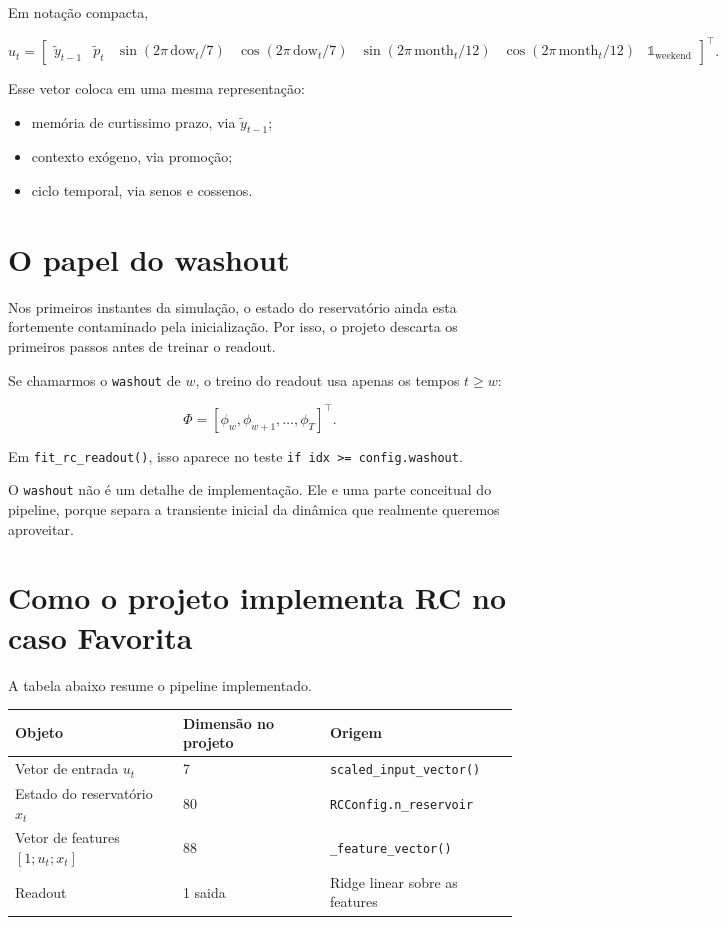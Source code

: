 \documentclass[12pt]{article}
\providecommand{\tightlist}{%
  \setlength{\itemsep}{0pt}\setlength{\parskip}{0pt}}
\begin{document}
Em notação compacta,

\[
u_t =
\begin{bmatrix}
\widetilde{y}_{t-1} &
\widetilde{p}_t &
\sin(2\pi \, \mathrm{dow}_t / 7) &
\cos(2\pi \, \mathrm{dow}_t / 7) &
\sin(2\pi \, \mathrm{month}_t / 12) &
\cos(2\pi \, \mathrm{month}_t / 12) &
\mathbb{1}_{\mathrm{weekend}}
\end{bmatrix}^\top.
\]

Esse vetor coloca em uma mesma representação:

\begin{itemize}
\tightlist
\item
  memória de curtissimo prazo, via \(\widetilde{y}_{t-1}\);
\item
  contexto exógeno, via promoção;
\item
  ciclo temporal, via senos e cossenos.
\end{itemize}

\section{O papel do washout}\label{6-o-papel-do-washout}

Nos primeiros instantes da simulação, o estado do reservatório ainda esta fortemente contaminado pela inicialização. Por isso, o projeto descarta os primeiros passos antes de treinar o readout.

Se chamarmos o \texttt{washout} de \(w\), o treino do readout usa apenas os tempos \(t \ge w\):

\[
\Phi = [\phi_w, \phi_{w+1}, \dots, \phi_T]^\top.
\]

Em \texttt{fit\_rc\_readout()}, isso aparece no teste \texttt{if\ idx\ \textgreater{}=\ config.washout}.

O \texttt{washout} não é um detalhe de implementação. Ele e uma parte conceitual do pipeline, porque separa a transiente inicial da dinâmica que realmente queremos aproveitar.

\section{Como o projeto implementa RC no caso Favorita}\label{7-como-o-projeto-implementa-rc-no-caso-favorita}

A tabela abaixo resume o pipeline implementado.

\begin{longtable}[]{@{}lll@{}}
\toprule\noalign{}
Objeto & Dimensão no projeto & Origem \\
\midrule\noalign{}
\endhead
\bottomrule\noalign{}
\endlastfoot
Vetor de entrada \(u_t\) & 7 & \texttt{scaled\_input\_vector()} \\
Estado do reservatório \(x_t\) & 80 & \texttt{RCConfig.n\_reservoir} \\
Vetor de features \([1; u_t; x_t]\) & 88 & \texttt{\_feature\_vector()} \\
Readout & 1 saida & Ridge linear sobre as features \\
\end{longtable}
\end{document}
